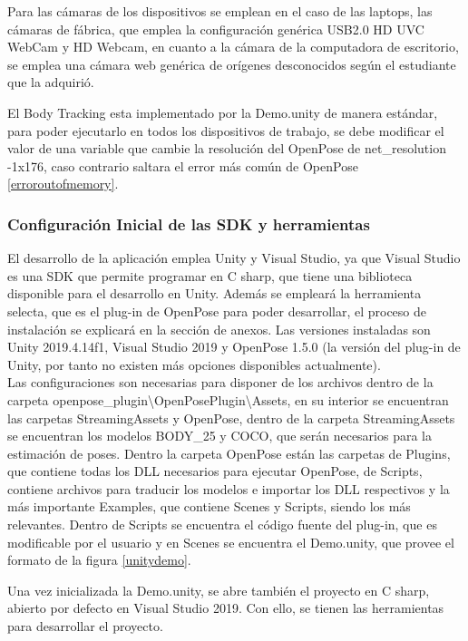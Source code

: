 Para las cámaras de los dispositivos se emplean en el caso de las laptops, las cámaras de fábrica, que emplea la configuración genérica USB2.0 HD UVC WebCam y HD Webcam, en cuanto a la cámara de la computadora de escritorio, se emplea una cámara web genérica de orígenes desconocidos según el estudiante que la adquirió. 

El Body Tracking esta implementado por la Demo.unity de manera estándar, para poder ejecutarlo en todos los dispositivos de trabajo, se debe modificar el valor de una variable que cambie la resolución del OpenPose de net\_resolution -1x176, caso contrario saltara el error más común de OpenPose \ref{erroroutofmemory}.


\subsubsection{Configuración Inicial de las SDK y herramientas}

El desarrollo de la aplicación emplea Unity y Visual Studio, ya que Visual Studio es una SDK que permite programar en C sharp, que tiene una biblioteca disponible para el desarrollo en Unity. Además se empleará la herramienta selecta, que es el plug-in de OpenPose para poder desarrollar, el proceso de instalación se explicará en la sección de anexos. Las versiones instaladas son Unity 2019.4.14f1, Visual Studio 2019 y OpenPose 1.5.0 (la versión del plug-in de Unity, por tanto no existen más opciones disponibles actualmente).
\\
Las configuraciones son necesarias para disponer de los archivos dentro de la carpeta openpose\_plugin\textbackslash OpenPosePlugin\textbackslash Assets, en su interior se encuentran las carpetas StreamingAssets y OpenPose, dentro de la carpeta StreamingAssets se encuentran los modelos BODY\_25 y COCO, que serán necesarios para la estimación de poses. Dentro la carpeta OpenPose están las carpetas de Plugins, que contiene todas los DLL necesarios para ejecutar OpenPose, de Scripts, contiene archivos para traducir los modelos e importar los DLL respectivos y la más importante Examples, que contiene Scenes y Scripts, siendo los más relevantes. Dentro de Scripts se encuentra el código fuente del plug-in, que es modificable por el usuario y en Scenes se encuentra el Demo.unity, que provee el formato de la figura \ref{unitydemo}.

Una vez inicializada la Demo.unity, se abre también el proyecto en C sharp, abierto por defecto en Visual Studio 2019. Con ello, se tienen las herramientas para desarrollar el proyecto.

